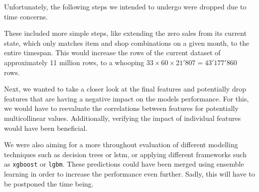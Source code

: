 Unfortunately, the following steps we intended to undergo were dropped due to time concerns.

These included more simple steps, like extending the zero sales from its current state, which only matches item and shop combinations on a given month, to the entire timespan.
This would increase the rows of the current dataset of approximately 11 million rows, to a whooping $33 \times 60 \times 21'807 = 43'177'860$ rows.

Next, we wanted to take a closer look at the final features and potentially drop features that are having a negative impact on the models performance. For this, we would have to reevaluate the correlations between features for potentially multicollinear values. Additionally, verifying the impact of individual features would have been beneficial.

We were also aiming for a more throughout evaluation of different modelling techniques such as decision trees or \acrshort{lstm}, or applying different frameworks such as \texttt{xgboost} or \texttt{\acrshort{lgbm}}.
These predictions could have been merged using ensemble learning in order to increase the performance even further. Sadly, this will have to be postponed the time being.
